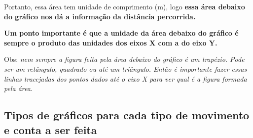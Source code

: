 \documentclass[12pt]{extarticle}
\newcommand{\<}{\langle}
\renewcommand{\>}{\rangle}
\theoremstyle{definition}
\begin{document}
Portanto, essa área tem unidade de comprimento (m), logo \textbf{essa área debaixo do gráfico nos dá a informação da distância percorrida.}

\textbf{Um ponto importante é que a unidade da área debaixo do gráfico é sempre o produto das unidades dos eixos X com a do eixo Y.}

Obs: \textit{nem sempre a figura feita pela área debaixo do gráfico é um trapézio. Pode ser um retângulo, quadrado ou até um triângulo. Então é importante fazer essas linhas tracejadas dos pontos dados até o eixo X para ver qual é a figura formada pela área.}

\subsection{Tipos de gráficos para cada tipo de movimento e conta a ser feita}
\end{document}
